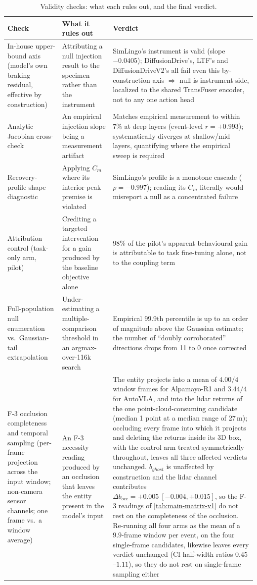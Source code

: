 \begin{table}[t]
\centering
\caption{Validity checks: what each rules out, and the final verdict.}
\label{tab:validity}
\footnotesize
\begin{tabular}{p{}p{}p{}}
\toprule
Check & What it rules out & Verdict \\
\midrule
In-house upper-bound axis (model's own braking residual, effective by construction) & Attributing a null injection result to the specimen rather than the instrument & SimLingo's instrument is valid (slope $-0.0405$); DiffusionDrive's, LTF's and DiffusionDriveV2's all fail even this by-construction axis $\Rightarrow$ null is instrument-side, localized to the shared TransFuser encoder, not to any one action head \\
Analytic Jacobian cross-check & An empirical injection slope being a measurement artifact & Matches empirical measurement to within 7\% at deep layers (event-level $r=+0.993$); systematically diverges at shallow/mid layers, quantifying where the empirical sweep is required \\
Recovery-profile shape diagnostic & Applying $C_m$ where its interior-peak premise is violated & SimLingo's profile is a monotone cascade ($\rho=-0.997$); reading its $C_m$ literally would misreport a null as a concentrated failure \\
Attribution control (task-only arm, pilot) & Crediting a targeted intervention for a gain produced by the baseline objective alone & 98\% of the pilot's apparent behavioural gain is attributable to task fine-tuning alone, not to the coupling term \\
Full-population null enumeration vs.\ Gaussian-tail extrapolation & Under-estimating a multiple-comparison threshold in an argmax-over-116k search & Empirical 99.9th percentile is up to an order of magnitude above the Gaussian estimate; the number of ``doubly corroborated'' directions drops from 11 to 0 once corrected \\
F-3 occlusion completeness and temporal sampling (per-frame projection across the input window; non-camera sensor channels; one frame vs.\ a window average) & An F-3 necessity reading produced by an occlusion that leaves the entity present in the model's input & The entity projects into a mean of $4.00/4$ window frames for Alpamayo-R1 and $3.44/4$ for AutoVLA, and into the lidar returns of the one point-cloud-consuming candidate (median 1 point at a median range of $27$\,m); occluding every frame into which it projects and deleting the returns inside its 3D box, with the control arm treated symmetrically throughout, leaves all three affected verdicts unchanged. $b_{ghost}$ is unaffected by construction and the lidar channel contributes $\Delta b_{occ}=+0.005\ [-0.004,+0.015]$, so the F-3 readings of \cref{tab:main-matrix-v1} do not rest on the completeness of the occlusion. Re-running all four arms as the mean of a $9.9$-frame window per event, on the four single-frame candidates, likewise leaves every verdict unchanged (CI half-width ratios $0.45$--$1.11$), so they do not rest on single-frame sampling either \\

\end{tabular}
\end{table}
